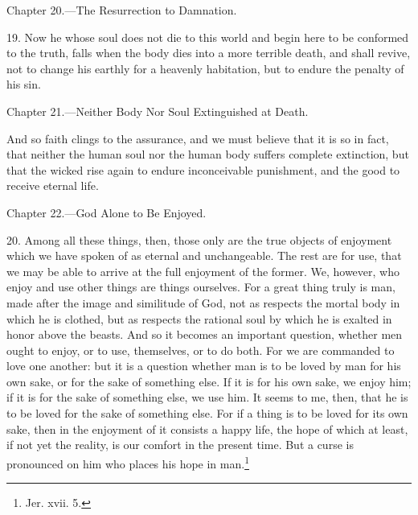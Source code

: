 
Chapter 20.—The Resurrection to Damnation.

19. Now he whose soul does not die to this world and begin here to be conformed to the truth, falls when the body dies into a more terrible death, and shall revive, not to change his earthly for a heavenly habitation, but to endure the penalty of his sin.


Chapter 21.—Neither Body Nor Soul Extinguished at Death.

And so faith clings to the assurance, and we must believe that it is so in fact, that neither the human soul nor the human body suffers complete extinction, but that the wicked rise again to endure inconceivable punishment, and the good to receive eternal life.


Chapter 22.—God Alone to Be Enjoyed.

20. Among all these things, then, those only are the true objects of enjoyment which we have spoken of as eternal and unchangeable. The rest are for use, that we may be able to arrive at the full enjoyment of the former. We, however, who enjoy and use other things are things ourselves. For a great thing truly is man, made after the image and similitude of God, not as respects the mortal body in which he is clothed, but as respects the rational soul by which he is exalted in honor above the beasts. And so it becomes an important question, whether men ought to enjoy, or to use, themselves, or to do both. For we are commanded to love one another: but it is a question whether man is to be loved by man for his own sake, or for the sake of something else. If it is for his own sake, we enjoy him; if it is for the sake of something else, we use him. It seems to me, then, that he is to be loved for the sake of something else. For if a thing is to be loved for its own sake, then in the enjoyment of it consists a happy life, the hope of which at least, if not yet the reality, is our comfort in the present time. But a curse is pronounced on him who places his hope in man.\footnote{Jer. xvii. 5.}

